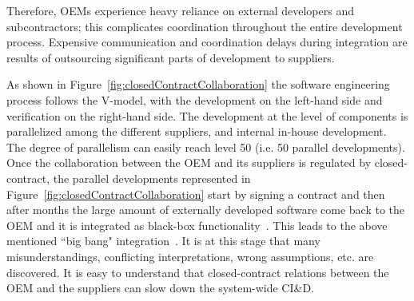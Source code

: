 Therefore, OEMs experience heavy reliance on external developers and subcontractors; this complicates coordination throughout the entire development process. Expensive communication and coordination delays during integration are results of outsourcing significant parts of development to suppliers. %

As shown in Figure~\ref{fig:closedContractCollaboration} the software engineering process follows the V-model, with the development on the left-hand side and verification on the right-hand side. The development at the level of components is parallelized among the different suppliers, and internal in-house development. The degree of parallelism can easily reach level 50 (i.e. 50 parallel developments). Once the collaboration between the OEM and its suppliers is regulated by closed-contract, the parallel developments represented in Figure~\ref{fig:closedContractCollaboration} start by signing a contract and then after months the large amount of externally developed software come back to the OEM and it is integrated as black-box functionality~\cite{Broy2009AAF_TUM,Broy:2006:CAS:1134285.1134292}. 
This leads to the above mentioned ``big bang" integration~\cite{Eklund2012}. %
It is at this stage that many misunderstandings, conflicting interpretations, wrong assumptions, etc. are discovered.
It is easy to understand that closed-contract relations between the OEM and the suppliers can slow down the system-wide CI\&D.  %

